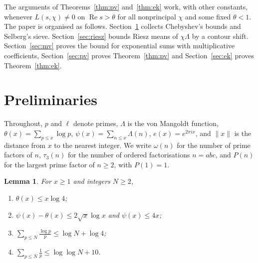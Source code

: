 \documentclass[screen,reqno]{aomart}
\numberwithin{equation}{section}
\newtheorem{lemma}[theorem]{Lemma}
\theoremstyle{definition}
\renewcommand{\Re}{\operatorname{Re}}
\begin{document}
The arguments of Theorems~\ref{thm:pv} and~\ref{thm:ek} work, with other constants, whenever $L(s,\chi)\ne0$ on $\Re s>\theta$ for all nonprincipal $\chi$
and some fixed $\theta<1$.
The paper is organised as follows. Section~\ref{sec:prelim} collects Chebyshev's bounds and
Selberg's sieve. Section~\ref{sec:riesz} bounds Riesz means of $\chi\Lambda$ by a contour shift.
Section~\ref{sec:mv} proves the bound for exponential sums with multiplicative coefficients,
Section~\ref{sec:pv} proves Theorem~\ref{thm:pv} and Section~\ref{sec:ek} proves
Theorem~\ref{thm:ek}.

\section{Preliminaries}\label{sec:prelim}

Throughout, $p$ and $\ell$ denote primes, $\Lambda$ is the von Mangoldt function,
$\theta(x)=\sum_{p\le x}\log p$, $\psi(x)=\sum_{n\le x}\Lambda(n)$, $e(x)=e^{2\pi ix}$, and
$\|x\|$ is the distance from $x$ to the nearest integer. We write $\omega(n)$ for the number of
prime factors of $n$, $\tau_3(n)$ for the number of ordered factorisations $n=abc$, and $P(n)$
for the largest prime factor of $n\ge2$, with $P(1)=1$.

\begin{lemma}\label{lem:chebyshev}
For $x\ge1$ and integers $N\ge2$,
\begin{enumerate}
\item[(i)] $\theta(x)\le x\log4$;
\item[(ii)] $\psi(x)-\theta(x)\le2\sqrt x\log x$ and $\psi(x)\le4x$;
\item[(iii)] $\sum_{p\le N}\frac{\log p}p\le\log N+\log4$;
\item[(iv)] $\sum_{p\le N}\frac1p\le\log\log N+10$.
\end{enumerate}
\end{lemma}
\end{document}
